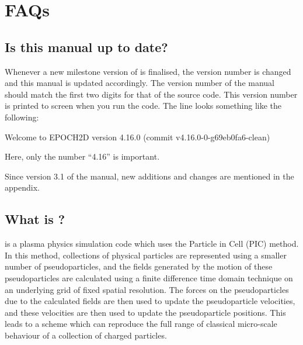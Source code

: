 


%

{
  \selectfont
}
\selectfont%
\tableofcontents%
\newpage%
\DefineShortVerb{\#}

\section{FAQs}

\subsection{Is this manual up to date?}

Whenever a new milestone version of {\EPOCH} is finalised, the version
number is changed and this manual is updated accordingly. The version number
of the manual should match the first two digits for that of the {\EPOCH}
source code.
This version number is printed to screen when you run the code. The line looks
something like the following:
\begin{boxverbatim}
 Welcome to EPOCH2D version 4.16.0   (commit v4.16.0-0-g69eb0fa6-clean)
\end{boxverbatim}
Here, only the number ``4.16'' is important.

Since version 3.1 of the manual, new additions and changes are mentioned
in the appendix.

\subsection{\texorpdfstring
  {What is {\EPOCH}?}
  {What is {EPOCH}?}}

{\EPOCH} is a plasma physics simulation code which uses the Particle in Cell
(PIC) method. In this method, collections of physical particles are represented
using a smaller number of pseudoparticles, and the fields generated by the
motion of these pseudoparticles are calculated using a finite difference time
domain technique on an underlying grid of fixed spatial resolution. The forces
on the pseudoparticles due to the calculated fields are then used to update the
pseudoparticle velocities, and these velocities are then used to update the
pseudoparticle positions. This leads to a scheme which can reproduce the full
range of classical micro-scale behaviour of a collection of charged
particles.

